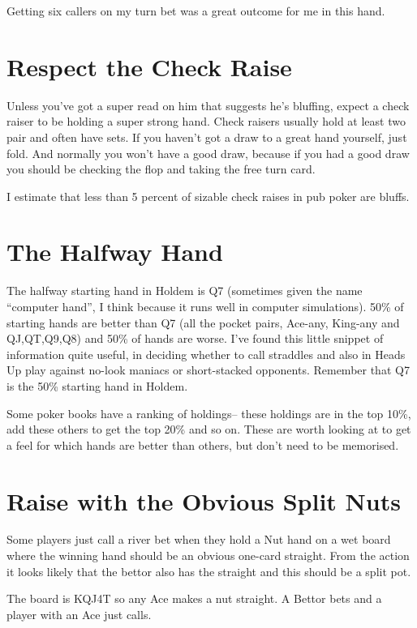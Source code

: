 Getting six callers on my turn bet was a great outcome for me in this hand.

\section{Respect the Check Raise}

Unless you've got a super read on him that suggests he's bluffing,
expect a check raiser to be holding a super strong hand. Check raisers
usually hold at least two pair and often have sets. If you haven't got
a draw to a great hand yourself, just fold. And normally you won't have
a good draw, because if you had a good draw you should be checking the
flop and taking the free turn card.

I estimate that less than 5 percent of sizable check raises in pub poker
are bluffs.

\section{The Halfway Hand}

The halfway starting hand in Holdem is Q7 (sometimes given the name
``computer hand'', I think because it runs well in computer simulations).
50\% of starting hands are better than Q7 (all the pocket pairs,
Ace-any, King-any and QJ,QT,Q9,Q8) and 50\% of hands are worse. I've
found this little snippet of information quite useful, in
deciding whether to call straddles and also in Heads Up play
against no-look maniacs or short-stacked opponents. Remember that Q7
is the 50\% starting hand in Holdem.

Some poker books have a ranking of holdings-- these holdings are in
the top 10\%, add these others to get the top 20\% and so on. These
are worth looking at to get a feel for which hands are better than
others, but don't need to be memorised.

\section{Raise with the Obvious Split Nuts}

Some players just call a river bet when they hold a Nut hand on a
wet board where the winning hand should be an obvious
one-card straight. From the action it looks likely that the bettor
also has the straight and this should be a split pot.

The board is KQJ4T so any Ace makes a nut straight. A Bettor
bets and a player with an Ace just calls.


